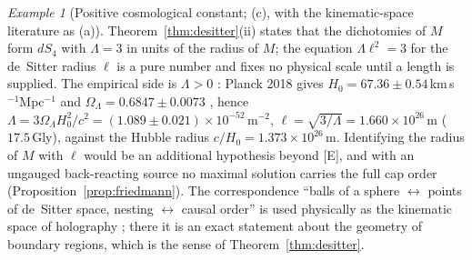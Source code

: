 \documentclass[aps,pra,onecolumn,superscriptaddress,nofootinbib,10pt]{revtex4-2}
\theoremstyle{definition}
\theoremstyle{remark}
\newtheorem{example}[theorem]{Example}
\begin{document}
\begin{example}[Positive cosmological constant; (c), with the kinematic-space literature as (a)]\label{ex:desitter}
Theorem~\ref{thm:desitter}(ii) states that the dichotomies of $M$ form $dS_4$ with $\Lambda=3$ in units of the
radius of $M$; the equation $\Lambda\ell^2=3$ for the de~Sitter radius $\ell$ is a pure number and fixes no physical
scale until a length is supplied.  The empirical side is $\Lambda>0$ \cite{ex-Riess98,ex-Perlmutter99}: Planck 2018
gives $H_0=67.36\pm0.54$\,km\,s$^{-1}$Mpc$^{-1}$ and $\Omega_\Lambda=0.6847\pm0.0073$ \cite{ex-Planck18}, hence
$\Lambda=3\Omega_\Lambda H_0^2/c^2=(1.089\pm0.021)\times10^{-52}\,\mathrm m^{-2}$, $\ell=\sqrt{3/\Lambda}=1.660\times10^{26}$\,m ($17.5$\,Gly),
against the Hubble radius $c/H_0=1.373\times10^{26}$\,m.  Identifying the radius of $M$ with $\ell$ would be an
additional hypothesis beyond [E], and with an ungauged back-reacting source no maximal solution carries the
full cap order (Proposition~\ref{prop:friedmann}).  The correspondence ``balls of a sphere $\leftrightarrow$ points of
de~Sitter space, nesting $\leftrightarrow$ causal order'' is used physically as the kinematic space of holography
\cite{CLMS15,dBHMN16,dBHHM16}; there it is an exact statement about the geometry of boundary regions, which
is the sense of Theorem~\ref{thm:desitter}.
\end{example}
\end{document}
